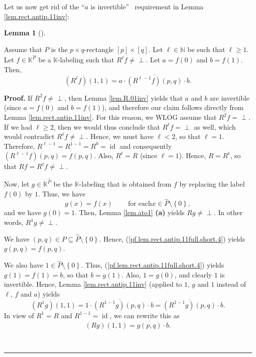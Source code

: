 \documentclass[numbers=enddot,12pt,final,onecolumn,notitlepage]{scrartcl}%
\theoremstyle{definition}
\newtheorem{lem}[theo]{Lemma}
\newenvironment{lemma}[1][]
{\begin{lem}[#1]\begin{leftbar}}
{\end{leftbar}\end{lem}}
\newenvironment{vershort}{}{}
\newcommand{\undf}{\operatorname*{\bot}}
\newenvironment{proof}[1][Proof]{\noindent\textbf{#1.} }{\ \rule{0.5em}{0.5em}}
\begin{document}
Let us now get rid of the \textquotedblleft$a$ is invertible\textquotedblright%
\ requirement in Lemma \ref{lem.rect.antip.11inv}:

\begin{lemma}
\label{lem.rect.antip.11full}Assume that $P$ is the $p\times q$-rectangle
$\left[  p\right]  \times\left[  q\right]  $. Let $\ell\in\mathbb{N}$ be such
that $\ell\geq1$. Let $f\in\mathbb{K}^{\widehat{P}}$ be a $\mathbb{K}%
$-labeling such that $R^{\ell}f\neq\undf$. Let $a=f\left(  0\right)  $ and
$b=f\left(  1\right)  $. Then,%
\[
\left(  R^{\ell}f\right)  \left(  1,1\right)  =a\cdot\overline{\left(
R^{\ell-1}f\right)  \left(  p,q\right)  }\cdot b.
\]

\end{lemma}

\begin{vershort}


\begin{proof}
If $R^{2}f\neq\undf$, then Lemma \ref{lem.R.01inv} yields that $a$ and $b$ are
invertible (since $a=f\left(  0\right)  $ and $b=f\left(  1\right)  $), and
therefore our claim follows directly from Lemma \ref{lem.rect.antip.11inv}.
For this reason, we WLOG assume that $R^{2}f=\undf$. If we had $\ell\geq2$,
then we would thus conclude that $R^{\ell}f=\undf$ as well, which would
contradict $R^{\ell}f\neq\undf$. Hence, we must have $\ell<2$, so that
$\ell=1$. Therefore, $R^{\ell-1}=R^{1-1}=R^{0}=\operatorname*{id}$ and
consequently $\left(  R^{\ell-1}f\right)  \left(  p,q\right)  =f\left(
p,q\right)  $. Also, $R^{\ell}=R$ (since $\ell=1$). Hence, $R=R^{\ell}$, so
that $Rf=R^{\ell}f\neq\undf$.

Now, let $g\in\mathbb{K}^{\widehat{P}}$ be the $\mathbb{K}$-labeling that is
obtained from $f$ by replacing the label $f\left(  0\right)  $ by $1$. Thus,
we have
\begin{equation}
g\left(  x\right)  =f\left(  x\right)  \ \ \ \ \ \ \ \ \ \ \text{for each
}x\in\widehat{P}\setminus\left\{  0\right\}  ,
\label{pf.lem.rect.antip.11full.short.4}%
\end{equation}
and we have $g\left(  0\right)  =1$. Then, Lemma \ref{lem.ato1} \textbf{(a)}
yields $Rg\neq\undf$. In other words, $R^{1}g\neq\undf$.

We have $\left(  p,q\right)  \in P\subseteq\widehat{P}\setminus\left\{
0\right\}  $. Hence, (\ref{pf.lem.rect.antip.11full.short.4}) yields $g\left(
p,q\right)  =f\left(  p,q\right)  $.

We also have $1\in\widehat{P}\setminus\left\{  0\right\}  $. Thus,
(\ref{pf.lem.rect.antip.11full.short.4}) yields $g\left(  1\right)  =f\left(
1\right)  =b$, so that $b=g\left(  1\right)  $. Also, $1=g\left(  0\right)  $,
and clearly $1$ is invertible. Hence, Lemma \ref{lem.rect.antip.11inv}
(applied to $1$, $g$ and $1$ instead of $\ell$, $f$ and $a$) yields
\[
\left(  R^{1}g\right)  \left(  1,1\right)  =1\cdot\overline{\left(
R^{1-1}g\right)  \left(  p,q\right)  }\cdot b=\overline{\left(  R^{1-1}%
g\right)  \left(  p,q\right)  }\cdot b.
\]
In view of $R^{1}=R$ and $R^{1-1}=\operatorname*{id}$, we can rewrite this as
\[
\left(  Rg\right)  \left(  1,1\right)  =\overline{g\left(  p,q\right)  }\cdot
b.
\]



\end{proof}
\end{vershort}
\end{document}
